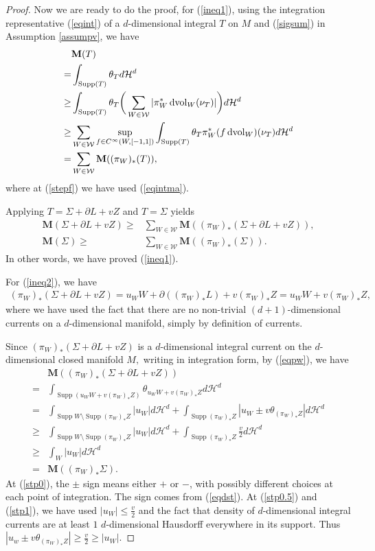 \documentclass[11pt,a4paper]{amsart}
\numberwithin{equation}{section}
\newcommand{\supp}{\operatorname{Supp}}
\newcommand{\Si}{\Sigma}
\newcommand{\ta}{\theta}
\newcommand{\ms}{\mathbf{M}}
\newcommand{\dvol}{\operatorname{dvol}}
\newcommand{\du}{^\ast}
\newcommand{\pf}{_\ast}
\newcommand{\pd}{\partial}
\newcommand{\Z}{\mathbb{Z}}
\theoremstyle{plain}
\theoremstyle{definition}
\numberwithin{equation}{subsection}
\begin{document}
\begin{proof}
Now we are ready to do the proof, for (\ref{ineq1}), using the integration representative (\ref{eqint}) of a $d$-dimensional integral $T$ on $M$ and (\ref{sigsum}) in Assumption \ref{assumpv}, we have
\begin{align}
	&\ms(T)\\=&\int_{\supp(T)}\ta_{T}d\mathcal{H}^d\\
	\ge&\int_{\supp(T)}\ta_{T}\textnormal{ }\bigg(\sum_{W\in\mathcal{W}}|\pi\du_W\dvol_W(\nu_{T})|\bigg)d\mathcal{H}^d\\
	\ge&\sum_{W\in\mathcal{W}}\sup_{f\in C^\infty(W,[-1,1])}\int_{\supp(T)}\ta_{T}\textnormal{ }\pi\du_W(f\dvol_W)(\nu_{T})d\mathcal{H}^d\\
	=&\sum_{W\in\mathcal{W}}\ms((\pi_W)\pf (T)),\label{stepf}
\end{align}
where at (\ref{stepf}) we have used (\ref{eqintma}).

Applying $T=\Si+\pd L+vZ$ and $T=\Si$ yields
\begin{align}
	\ms(\Si+\pd L+vZ)\ge& \sum_{W\in\mathcal{W}}\ms((\pi_W)\pf(\Si+\pd L+vZ)),\\
\label{ineqms}\ms(\Si)\ge&	\sum_{W\in\mathcal{W}}\ms((\pi_W)\pf (\Si)).
\end{align}
In other words, we have proved (\ref{ineq1}).

For (\ref{ineq2}), we have
\begin{align}\label{eqpw}
	(\pi_W)\pf(\Si+\pd L+vZ)=u_WW+\pd((\pi_W)\pf L)+v(\pi_W)\pf Z=u_WW+v(\pi_W)\pf Z,
\end{align}
where we have used the fact that there are no non-trivial $(d+1)$-dimensional currents on a $d$-dimensional manifold, simply by definition of currents.


Since $(\pi_W)\pf(\Si+\pd L+vZ)$ is a $d$-dimensional integral current on the $d$-dimensional closed manifold $M,$ writing in integration form, by (\ref{eqpw}), we have\begin{align}
	&\ms((\pi_W)\pf(\Si+\pd L+vZ))\\=&\int_{\supp(u_WW+v(\pi_W)\pf Z)}\ta_{u_WW+v(\pi_{W})\pf Z}d\mathcal{H}^d\\
\label{stp0}	=&\int_{\supp W\setminus\supp (\pi_W)\pf Z}|u_W|d\mathcal{H}^d+\int_{\supp(\pi_W)\pf Z}|u_W\pm v\ta_{(\pi_W)\pf Z}|d\mathcal{H}^d\\
\label{stp0.5}	\ge&\int_{\supp W\setminus\supp (\pi_W)\pf Z}|u_W|d\mathcal{H}^d+\int_{\supp(\pi_W)\pf Z}\frac{v}{2}d\mathcal{H}^d\\
\label{stp1}	\ge&\int_{W}|u_W|d\mathcal{H}^d\\
	=&\ms((\pi_W)\pf \Si).
\end{align}
At (\ref{stp0}), the $\pm$ sign means either $+$ or $-$, with possibly different choices at each point of integration. The sign comes from (\ref{eqdst}). At (\ref{stp0.5}) and (\ref{stp1}), we have used $|u_W|\le\frac{v}{2}$ and the fact that density of $d$-dimensional integral currents are at least $1$ $d$-dimensional Hausdorff everywhere in its support. Thus $|u_w\pm v\ta_{(\pi_W)\pf Z}|\ge \frac{v}{2}\ge |u_W|.$


\end{proof}
\end{document}
